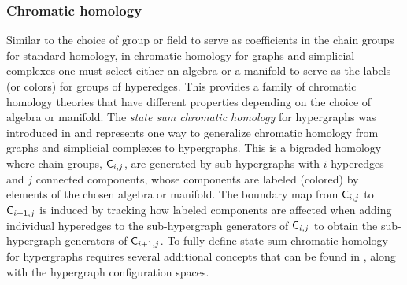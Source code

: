 \documentclass{amsart}
\newcommand{\Cgroup}        {\mm{\sf C}}
\newcommand {\mm}[1]        {\ifmmode{#1}\else{\mbox{\(#1\)}}\fi}
\begin{document}
\subsubsection{Chromatic homology}
Similar to the choice of group or field to serve as coefficients in the chain groups for standard homology, in chromatic homology for graphs \cite{eastwood2007euler, baranovsky2012graph} and simplicial complexes \cite{CDS2019} one must select either an algebra \cite{HGR2005, HGRArb2005} or a manifold to serve as the labels (or colors) for groups of hyperedges.
This provides a family of chromatic homology theories that have different properties depending on the choice of algebra or manifold.
The \emph{state sum chromatic homology} for hypergraphs was introduced in \cite{aslam2023categorifying} and represents one way to generalize chromatic homology from graphs and simplicial complexes to hypergraphs.
This is a bigraded homology where chain groups, $\Cgroup_{i,j}$, are generated by sub-hypergraphs with $i$ hyperedges and $j$ connected components, whose components are labeled (colored) by elements of the chosen algebra or manifold.
The boundary map from $\Cgroup_{i, j}$ to $\Cgroup_{i+1, j}$ is induced by tracking how labeled components are affected when adding individual hyperedges to the sub-hypergraph generators of $\Cgroup_{i,j}$ to obtain the sub-hypergraph generators of $\Cgroup_{i+1,j}$.
To fully define state sum chromatic homology for hypergraphs requires several additional concepts that can be found in \cite{aslam2023categorifying}, along with the hypergraph configuration spaces.
\end{document}
